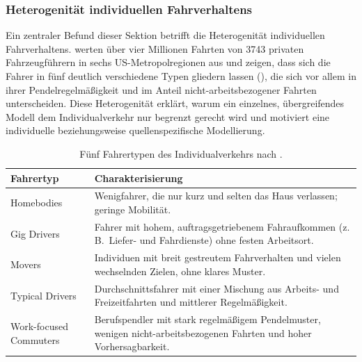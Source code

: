 
\subsubsection{Heterogenität individuellen Fahrverhaltens}
\label{subsec:heterogenitaet}

Ein zentraler Befund dieser Sektion betrifft die Heterogenität individuellen Fahrverhaltens. \textcite{ji2023rethinking} werten über vier Millionen Fahrten von 3743 privaten Fahrzeugführern in sechs US-Metropolregionen aus und zeigen, dass sich die Fahrer in fünf deutlich verschiedene Typen gliedern lassen (), die sich vor allem in ihrer Pendelregelmäßigkeit und im Anteil nicht-arbeitsbezogener Fahrten unterscheiden. Diese Heterogenität erklärt, warum ein einzelnes, übergreifendes Modell dem Individualverkehr nur begrenzt gerecht wird und motiviert eine individuelle beziehungsweise quellenspezifische Modellierung.

\begin{table}[H]
  \centering
  \begin{tabularx}{\textwidth}{lX}
    \toprule
    \textbf{Fahrertyp} & \textbf{Charakterisierung} \\
    \midrule
    Homebodies & Wenigfahrer, die nur kurz und selten das Haus verlassen; geringe Mobilität. \\
    \addlinespace
    Gig Drivers & Fahrer mit hohem, auftragsgetriebenem Fahraufkommen (z.\,B.\ Liefer- und Fahrdienste) ohne festen Arbeitsort. \\
    \addlinespace
    Movers & Individuen mit breit gestreutem Fahrverhalten und vielen wechselnden Zielen, ohne klares Muster. \\
    \addlinespace
    Typical Drivers & Durchschnittsfahrer mit einer Mischung aus Arbeits- und Freizeitfahrten und mittlerer Regelmäßigkeit. \\
    \addlinespace
    Work-focused Commuters & Berufspendler mit stark regelmäßigem Pendelmuster, wenigen nicht-arbeitsbezogenen Fahrten und hoher Vorhersagbarkeit. \\
    \bottomrule
  \end{tabularx}
  \caption{Fünf Fahrertypen des Individualverkehrs nach \textcite{ji2023rethinking}.}
  \label{tab:fahrertypen}
\end{table}


